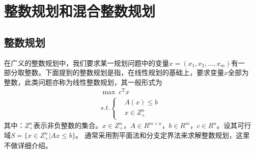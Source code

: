 \chapter{整数规划和混合整数规划}
\section{整数规划}
    \par
    在广义的整数规划中，我们要求某一规划问题中的变量$x=(x_1,x_2,\ldots,x_m)$有一部分取整数。下面提到的整数规划是指，在线性规划的基础上，要求变量$x$全部为整数，此类问题亦称为线性整数规划，其一般形式为
    \begin{align*}
    & \mathop{\max} \  c^\mathrm{T} x\\
    &s.t.\left\{
    \begin{aligned}
    &A(x) \leqslant b\\
    &x \in Z_+^n
    \end{aligned}
    \right.
    \end{align*}
    其中：$Z_+^n$表示非负整数的集合。$x \in Z_+^n$，$A \in R^{m\times n}$，$b \in R^m$，$c \in R^n$。设其可行域$S=\{x \in Z_+^n|Ax \leqslant b\}$。
    通常采用割平面法和分支定界法来求解整数规划，这里不做详细介绍。
